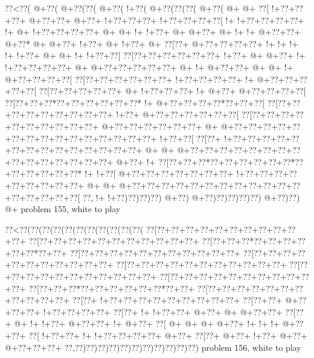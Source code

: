 \vbox{\vbox{\goo
\0??<\0??(\- @+\0??(\- @+\0??(\0??(\- @+\0??(\- !+\0??(\- @+\0??(\0??(\0??(\- @+\0??(\- @+\- @+
\0??[\- !+\0??+\0??+\0??+\- @+\0??+\0??+\- @+\0??+\- !+\0??+\0??+\0??+\- !+\0??+\0??+\0??+\0??[
\- !+\- !+\0??+\0??+\0??+\0??+\- !+\- @+\- !+\0??+\0??+\0??+\0??+\- @+\- @+\- !+\- !+\0??+\- @+
\- @+\0??+\- @+\- !+\- !+\- @+\0??+\0??+\- @+\0??*\- @+\- @+\0??+\- !+\0??+\- @+\- !+\0??+\- @+
\0??[\0??+\- @+\0??+\0??+\0??+\0??+\- !+\- !+\- !+\- !+\- !+\0??+\- @+\- @+\- !+\- !+\0??+\0??[
\0??[\0??+\0??+\0??+\0??+\0??+\0??+\- !+\0??+\- @+\- @+\0??+\- !+\- !+\0??+\0??+\0??+\0??+\- @+
\- @+\0??+\0??+\0??+\0??+\0??+\- @+\- !+\- @+\0??+\0??+\- @+\- @+\- !+\- @+\0??+\0??+\0??+\0??[
\0??[\0??+\0??+\0??+\0??+\0??+\0??+\- !+\0??+\0??+\0??+\0??+\- !+\- @+\0??+\0??+\0??+\0??+\0??[
\0??[\0??+\0??+\0??+\0??+\0??+\- @+\- !+\0??+\0??+\0??+\- !+\- @+\0??+\- @+\0??+\0??+\0??+\0??[
\0??[\0??+\0??+\0??*\0??+\0??+\0??+\0??+\0??+\0??*\- !+\- @+\0??+\0??+\0??+\0??*\0??+\0??+\0??[
\0??[\0??+\0??+\0??+\0??+\0??+\0??+\0??+\0??+\0??+\- !+\0??+\- @+\0??+\0??+\0??+\0??+\0??+\0??[
\0??[\0??+\0??+\0??+\0??+\0??+\0??+\0??+\0??+\0??+\0??+\- @+\0??+\0??+\0??+\0??+\0??+\0??+\- @+
\- @+\0??+\0??+\0??+\0??+\0??+\0??+\0??+\0??+\0??+\0??+\0??+\0??+\0??+\0??+\0??+\- !+\0??+\0??[
\0??[\0??+\- !+\0??+\0??+\0??+\0??+\0??+\0??+\0??+\0??+\0??+\0??+\0??+\0??+\0??+\0??+\- @+\- @+
\- @+\0??+\0??+\0??+\0??+\0??+\0??+\0??+\0??+\0??+\0??+\0??+\0??+\0??+\0??+\0??+\- @+\0??+\- !+
\0??[\0??+\0??+\0??*\0??+\0??+\0??+\0??+\0??+\0??*\0??+\0??+\0??+\0??+\0??+\0??*\- !+\- !+\0??[
\- @+\0??+\0??+\0??+\0??+\0??+\0??+\0??+\- !+\0??+\0??+\0??+\0??+\0??+\0??+\0??+\0??+\0??+\- @+
\- @+\- @+\0??+\0??+\0??+\0??+\0??+\0??+\0??+\0??+\0??+\0??+\0??+\0??+\0??+\0??+\0??+\0??+\0??[
\0??,\- !+\- !+\0??)\0??)\0??)\0??)\- @+\0??)\- @+\0??)\0??)\0??)\0??)\0??)\- @+\0??)\0??)\- @+
}
\hfil problem 155, white to play\hfil\break
}

\vbox{\vbox{\goo
\0??<\0??(\0??(\0??(\0??(\0??(\0??(\0??(\0??(\0??(\0??(\0??(
\0??[\0??+\0??+\0??+\0??+\0??+\0??+\0??+\0??+\0??+\0??+\0??+
\0??[\0??+\0??+\0??+\0??+\0??+\0??+\0??+\0??+\0??+\0??+\0??+
\0??[\0??+\0??+\0??*\0??+\0??+\0??+\0??+\0??+\0??*\0??+\0??+
\0??[\0??+\0??+\0??+\0??+\0??+\0??+\0??+\0??+\0??+\0??+\0??+
\0??[\0??+\0??+\0??+\0??+\0??+\0??+\0??+\0??+\0??+\0??+\0??+
\0??[\0??+\0??+\0??+\0??+\0??+\0??+\0??+\0??+\0??+\0??+\0??+
\0??[\0??+\0??+\0??+\0??+\0??+\0??+\0??+\0??+\0??+\0??+\0??+
\0??[\0??+\0??+\0??+\0??+\0??+\0??+\0??+\0??+\0??+\0??+\0??+
\0??[\0??+\0??+\0??*\0??+\0??+\0??+\0??+\0??+\0??*\0??+\0??+
\0??[\0??+\0??+\0??+\0??+\0??+\0??+\0??+\0??+\0??+\0??+\0??+
\0??[\0??+\- !+\0??+\0??+\0??+\0??+\0??+\0??+\0??+\0??+\0??+
\0??[\0??+\0??+\- @+\0??+\0??+\0??+\- !+\0??+\0??+\0??+\0??+
\0??[\0??+\- !+\- !+\0??+\0??+\- @+\0??+\- @+\- @+\0??+\0??+
\0??[\0??+\- @+\- !+\- !+\0??+\- @+\0??+\0??+\- !+\- @+\0??+
\0??[\- @+\- @+\- @+\- @+\0??+\- !+\- !+\- !+\- @+\0??+\0??+
\0??[\- !+\0??+\0??+\- !+\- !+\0??+\0??+\0??+\0??+\- @+\0??+
\0??[\0??+\- @+\0??+\- !+\0??+\- @+\0??+\- @+\0??+\0??+\0??+
\0??,\0??)\0??)\0??)\0??)\0??)\0??)\0??)\0??)\0??)\0??)\0??)
}
\hfil problem 156, white to play\hfil\break
}

